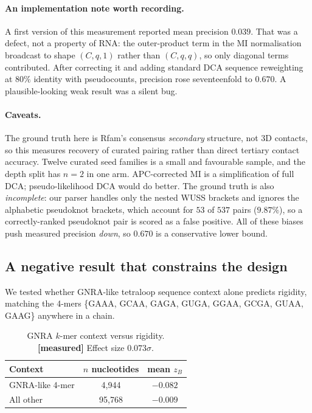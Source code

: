\documentclass[11pt,a4paper]{article}
\newcommand{\meas}{\textcolor{measured}{\textbf{[measured]}}}
\begin{document}
\paragraph{An implementation note worth recording.} A first version of this
measurement reported mean precision $0.039$. That was a defect, not a property
of RNA: the outer-product term in the MI normalisation broadcast to shape
$(C,q,1)$ rather than $(C,q,q)$, so only diagonal terms contributed. After
correcting it and adding standard DCA sequence reweighting at $80\%$ identity
with pseudocounts, precision rose seventeenfold to $0.670$. A plausible-looking
weak result was a silent bug.

\paragraph{Caveats.} The ground truth here is Rfam's consensus \emph{secondary}
structure, not 3D contacts, so this measures recovery of curated pairing rather
than direct tertiary contact accuracy. Twelve curated seed families is a small
and favourable sample, and the depth split has $n=2$ in one arm.
APC-corrected MI is a simplification of full DCA; pseudo-likelihood DCA would do
better. The ground truth is also \emph{incomplete}: our parser handles only the
nested WUSS brackets and ignores the alphabetic pseudoknot brackets, which
account for $53$ of $537$ pairs ($9.87\%$), so a correctly-ranked pseudoknot pair
is scored as a false positive. All of these biases push measured precision
\emph{down}, so $0.670$ is a conservative lower bound.

\subsection{A negative result that constrains the design}

We tested whether GNRA-like tetraloop sequence context alone predicts rigidity,
matching the 4-mers \{GAAA, GCAA, GAGA, GUGA, GGAA, GCGA, GUAA, GAAG\} anywhere
in a chain.

\begin{table}[h]
\centering
\caption{GNRA $k$-mer context versus rigidity. \meas{} Effect size $0.073\sigma$.}
\label{tab:gnra}
\begin{tabular}{lcc}
\toprule
\textbf{Context} & \textbf{$n$ nucleotides} & \textbf{mean $z_B$} \\
\midrule
GNRA-like 4-mer & 4{,}944 & $-0.082$ \\
All other       & 95{,}768 & $-0.009$ \\
\bottomrule
\end{tabular}
\end{table}
\end{document}
